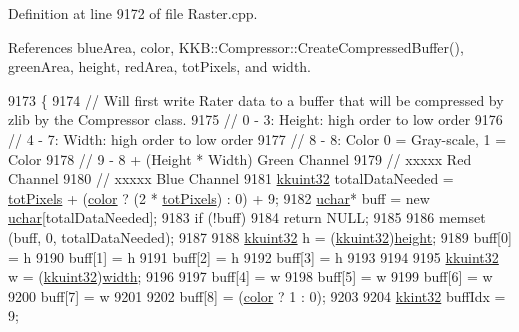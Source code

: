 Definition at line 9172 of file Raster.\+cpp.



References blue\+Area, color, K\+K\+B\+::\+Compressor\+::\+Create\+Compressed\+Buffer(), green\+Area, height, red\+Area, tot\+Pixels, and width.


\begin{DoxyCode}
9173 \{
9174   \textcolor{comment}{// Will first write Rater data to a buffer that will be compressed by zlib by the Compressor class.}
9175   \textcolor{comment}{// 0 - 3:    Height:  high order to low order}
9176   \textcolor{comment}{// 4 - 7:    Width:   high order to low order}
9177   \textcolor{comment}{// 8 - 8:    Color    0 = Gray-scale,  1 = Color}
9178   \textcolor{comment}{// 9 - 8 + (Height * Width) Green Channel}
9179   \textcolor{comment}{// xxxxx                    Red  Channel}
9180   \textcolor{comment}{// xxxxx                    Blue Channel}
9181   \hyperlink{namespace_k_k_b_af8d832f05c54994a1cce25bd5743e19a}{kkuint32}  totalDataNeeded = \hyperlink{class_k_k_b_1_1_raster_a9b08c4a0ca0a35435a478599635f1dc0}{totPixels} + (\hyperlink{class_k_k_b_1_1_raster_a482384d89cc53fa4f36276307c746854}{color} ? (2 * 
      \hyperlink{class_k_k_b_1_1_raster_a9b08c4a0ca0a35435a478599635f1dc0}{totPixels}) : 0) + 9;
9182   \hyperlink{namespace_k_k_b_ace9969169bf514f9ee6185186949cdf7}{uchar}*  buff = \textcolor{keyword}{new} \hyperlink{namespace_k_k_b_ace9969169bf514f9ee6185186949cdf7}{uchar}[totalDataNeeded];
9183   \textcolor{keywordflow}{if}  (!buff)
9184     \textcolor{keywordflow}{return}  NULL;
9185 
9186   memset (buff, 0, totalDataNeeded);
9187 
9188   \hyperlink{namespace_k_k_b_af8d832f05c54994a1cce25bd5743e19a}{kkuint32}  h = (\hyperlink{namespace_k_k_b_af8d832f05c54994a1cce25bd5743e19a}{kkuint32})\hyperlink{class_k_k_b_1_1_raster_af39ff189de4fbb6de98392e187efafb7}{height};
9189   buff[0] = h %
9190   buff[1] = h %
9191   buff[2] = h %
9192   buff[3] = h %
9193 
9194 
9195   \hyperlink{namespace_k_k_b_af8d832f05c54994a1cce25bd5743e19a}{kkuint32}  w = (\hyperlink{namespace_k_k_b_af8d832f05c54994a1cce25bd5743e19a}{kkuint32})\hyperlink{class_k_k_b_1_1_raster_ae0bcc103e191c3421d7692dc69ceb554}{width};
9196   
9197   buff[4] = w %
9198   buff[5] = w %
9199   buff[6] = w %
9200   buff[7] = w %
9201 
9202   buff[8] = (\hyperlink{class_k_k_b_1_1_raster_a482384d89cc53fa4f36276307c746854}{color} ? 1 : 0);
9203 
9204   \hyperlink{namespace_k_k_b_a8fa4952cc84fda1de4bec1fbdd8d5b1b}{kkint32}  buffIdx = 9;

\end{DoxyCode}
